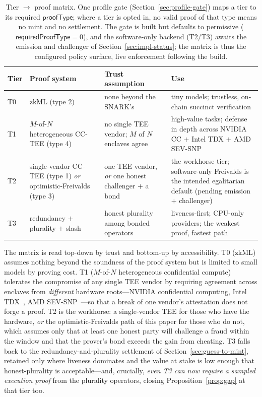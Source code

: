 \begin{table}[t]
\centering
\caption{Tier $\to$ proof matrix. One profile gate
(Section~\ref{sec:profile-gate}) maps a tier to its required $\mathsf{proofType}$;
where a tier is opted in, no valid proof of that type means no mint and no settlement.
The gate is built but defaults to permissive ($\mathsf{requiredProofType}=0$), and the
software-only backend (T2/T3) awaits the emission and challenger of
Section~\ref{sec:impl-status}; the matrix is thus the configured policy surface, live
enforcement following the build.}
\label{tab:tiers}
\small
\begin{tabular}{@{}p{0.7cm}p{3.3cm}p{4.1cm}p{4.0cm}@{}}
\toprule
Tier & Proof system & Trust assumption & Use \\
\midrule
T0 & zkML (type 2) & none beyond the SNARK's & tiny models; trustless, on-chain succinct verification \\
T1 & $M$-of-$N$ heterogeneous CC-TEE (type 4) & no single TEE vendor; $M$ of $N$ enclaves agree & high-value tasks; defense in depth across NVIDIA CC $+$ Intel TDX $+$ AMD SEV-SNP \\
T2 & single-vendor CC-TEE (type 1) \emph{or} optimistic-Freivalds (type 3) & one TEE vendor, \emph{or} one honest challenger $+$ a bond & the workhorse tier; software-only Freivalds is the intended egalitarian default (pending emission $+$ challenger) \\
T3 & redundancy $+$ plurality $+$ slash & honest plurality among bonded operators & liveness-first; CPU-only providers; the weakest proof, fastest path \\
\bottomrule
\end{tabular}
\end{table}

The matrix is read top-down by trust and bottom-up by accessibility. T0 (zkML)
assumes nothing beyond the soundness of the proof system but is limited to small
models by proving cost. T1 ($M$-of-$N$ heterogeneous confidential compute) tolerates
the compromise of any single TEE vendor by requiring agreement across enclaves from
\emph{different} hardware roots---NVIDIA confidential computing, Intel
TDX~\cite{inteltdx}, AMD SEV-SNP~\cite{amdsevsnp}---so that a break of one vendor's
attestation does not forge a proof. T2 is the workhorse: a single-vendor TEE for
those who have the hardware, \emph{or} the optimistic-Freivalds path of this paper for
those who do not, which assumes only that at least one honest party will challenge a
fraud within the window and that the prover's bond exceeds the gain from cheating. T3
falls back to the redundancy-and-plurality settlement of
Section~\ref{sec:guess-to-mint}, retained only where liveness dominates and the value
at stake is low enough that honest-plurality is acceptable---and, crucially,
\emph{even T3 can now require a sampled execution proof} from the plurality operators,
closing Proposition~\ref{prop:gap} at that tier too.

